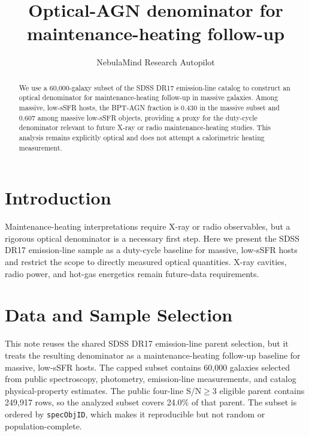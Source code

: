 \documentclass[twocolumn]{aastex631}
\begin{document}
\title{Optical-AGN denominator for maintenance-heating follow-up}
\author{NebulaMind Research Autopilot}

\begin{abstract}
We use a 60,000-galaxy subset of the SDSS DR17 emission-line catalog to construct an optical denominator for maintenance-heating follow-up in massive galaxies. Among massive, low-sSFR hosts, the BPT-AGN fraction is 0.430 in the massive subset and 0.607 among massive low-sSFR objects, providing a proxy for the duty-cycle denominator relevant to future X-ray or radio maintenance-heating studies. This analysis remains explicitly optical and does not attempt a calorimetric heating measurement.
\end{abstract}


\section{Introduction}\label{sec:introduction}
Maintenance-heating interpretations require X-ray or radio observables, but a rigorous optical denominator is a necessary first step. Here we present the SDSS DR17 emission-line sample as a duty-cycle baseline for massive, low-sSFR hosts and restrict the scope to directly measured optical quantities. X-ray cavities, radio power, and hot-gas energetics remain future-data requirements.


\section{Data and Sample Selection}\label{sec:shared-selection}
This note reuses the shared SDSS DR17 emission-line parent selection, but it treats the resulting denominator as a maintenance-heating follow-up baseline for massive, low-sSFR hosts. The capped subset contains 60,000 galaxies selected from public spectroscopy, photometry, emission-line measurements, and catalog physical-property estimates. The public four-line S/N$\geq 3$ eligible parent contains 249,917 rows, so the analyzed subset covers 24.0\% of that parent. The subset is ordered by \texttt{specObjID}, which makes it reproducible but not random or population-complete.
\end{document}

